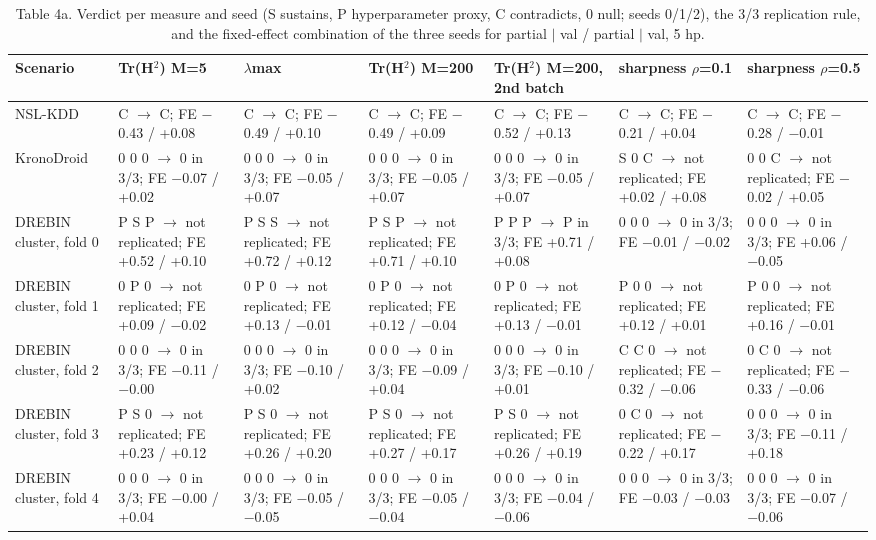 \begin{table}[t]
\centering\small
\caption{Table 4a. Verdict per measure and seed (S sustains, P hyperparameter proxy, C contradicts, 0 null; seeds 0/1/2), the 3/3 replication rule, and the fixed-effect combination of the three seeds for partial $\mid$ val / partial $\mid$ val, 5 hp.}
\label{tab:measures}
\begin{tabular}{lllllll}
\toprule
Scenario & Tr(H$^2$) M=5 & $\lambda$max & Tr(H$^2$) M=200 & Tr(H$^2$) M=200, 2nd batch & sharpness $\rho$=0.1 & sharpness $\rho$=0.5 \\
\midrule
NSL-KDD & C $\rightarrow$ C; FE $-$0.43 / +0.08 & C $\rightarrow$ C; FE $-$0.49 / +0.10 & C $\rightarrow$ C; FE $-$0.49 / +0.09 & C $\rightarrow$ C; FE $-$0.52 / +0.13 & C $\rightarrow$ C; FE $-$0.21 / +0.04 & C $\rightarrow$ C; FE $-$0.28 / $-$0.01 \\
KronoDroid & 0 0 0 $\rightarrow$ 0 in 3/3; FE $-$0.07 / +0.02 & 0 0 0 $\rightarrow$ 0 in 3/3; FE $-$0.05 / +0.07 & 0 0 0 $\rightarrow$ 0 in 3/3; FE $-$0.05 / +0.07 & 0 0 0 $\rightarrow$ 0 in 3/3; FE $-$0.05 / +0.07 & S 0 C $\rightarrow$ not replicated; FE +0.02 / +0.08 & 0 0 C $\rightarrow$ not replicated; FE $-$0.02 / +0.05 \\
DREBIN cluster, fold 0 & P S P $\rightarrow$ not replicated; FE +0.52 / +0.10 & P S S $\rightarrow$ not replicated; FE +0.72 / +0.12 & P S P $\rightarrow$ not replicated; FE +0.71 / +0.10 & P P P $\rightarrow$ P in 3/3; FE +0.71 / +0.08 & 0 0 0 $\rightarrow$ 0 in 3/3; FE $-$0.01 / $-$0.02 & 0 0 0 $\rightarrow$ 0 in 3/3; FE +0.06 / $-$0.05 \\
DREBIN cluster, fold 1 & 0 P 0 $\rightarrow$ not replicated; FE +0.09 / $-$0.02 & 0 P 0 $\rightarrow$ not replicated; FE +0.13 / $-$0.01 & 0 P 0 $\rightarrow$ not replicated; FE +0.12 / $-$0.04 & 0 P 0 $\rightarrow$ not replicated; FE +0.13 / $-$0.01 & P 0 0 $\rightarrow$ not replicated; FE +0.12 / +0.01 & P 0 0 $\rightarrow$ not replicated; FE +0.16 / $-$0.01 \\
DREBIN cluster, fold 2 & 0 0 0 $\rightarrow$ 0 in 3/3; FE $-$0.11 / $-$0.00 & 0 0 0 $\rightarrow$ 0 in 3/3; FE $-$0.10 / +0.02 & 0 0 0 $\rightarrow$ 0 in 3/3; FE $-$0.09 / +0.04 & 0 0 0 $\rightarrow$ 0 in 3/3; FE $-$0.10 / +0.01 & C C 0 $\rightarrow$ not replicated; FE $-$0.32 / $-$0.06 & 0 C 0 $\rightarrow$ not replicated; FE $-$0.33 / $-$0.06 \\
DREBIN cluster, fold 3 & P S 0 $\rightarrow$ not replicated; FE +0.23 / +0.12 & P S 0 $\rightarrow$ not replicated; FE +0.26 / +0.20 & P S 0 $\rightarrow$ not replicated; FE +0.27 / +0.17 & P S 0 $\rightarrow$ not replicated; FE +0.26 / +0.19 & 0 C 0 $\rightarrow$ not replicated; FE $-$0.22 / +0.17 & 0 0 0 $\rightarrow$ 0 in 3/3; FE $-$0.11 / +0.18 \\
DREBIN cluster, fold 4 & 0 0 0 $\rightarrow$ 0 in 3/3; FE $-$0.00 / +0.04 & 0 0 0 $\rightarrow$ 0 in 3/3; FE $-$0.05 / $-$0.05 & 0 0 0 $\rightarrow$ 0 in 3/3; FE $-$0.05 / $-$0.04 & 0 0 0 $\rightarrow$ 0 in 3/3; FE $-$0.04 / $-$0.06 & 0 0 0 $\rightarrow$ 0 in 3/3; FE $-$0.03 / $-$0.03 & 0 0 0 $\rightarrow$ 0 in 3/3; FE $-$0.07 / $-$0.06 \\
\bottomrule
\end{tabular}
\end{table}
